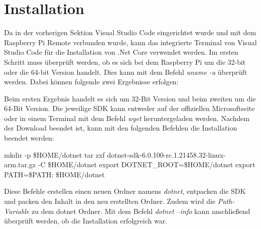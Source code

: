 \section{Installation}
\label{sec:installation}
Da in der vorherigen Sektion \emph{} Visual Studio Code
eingerichtet wurde und mit dem Raspberry Pi
Remote verbunden wurde, kann das integrierte Terminal von Visual Studio Code für die
Installation von .Net Core verwendet werden.
\newline
\newline
Im ersten Schritt muss überprüft werden, ob es sich bei dem Raspberry Pi um die 32-bit oder die
64-bit
Version handelt. Dies kann mit dem Befehl \emph{uname -a} überprüft werden. Dabei können folgende
zwei Ergebnisse erfolgen:
Beim ersten Ergebnis handelt es sich um 32-Bit Version und beim zweiten um die 64-Bit Version.
\newline
\newline
Die jeweilige SDK kann entweder auf der offiziellen Microsoftseite oder in einem Terminal mit dem
Befehl \emph{wget} heruntergeladen werden. Nachdem der Download
beendet ist, kann mit den folgenden Befehlen die Installation beendet werden:
\begin{zitat}
    mkdir -p \$HOME/dotnet
    \newline
    tar zxf dotnet-sdk-6.0.100-rc.1.21458.32-linux-arm.tar.gz -C \$HOME/dotnet
    \newline
    export DOTNET\_ROOT=\$HOME/dotnet
    \newline
    export PATH=\$PATH: \$HOME/dotnet
\end{zitat}

Diese Befehle erstellen einen neuen Ordner namens \emph{dotnet}, entpacken die SDK und packen den
Inhalt in den neu erstellten Ordner. Zudem wird die \emph{Path-Variable} zu dem dotnet Ordner.
\newline
\newline
Mit dem Befehl \emph{dotnet --info} kann anschließend überprüft werden, ob die Installation
erfolgreich war.